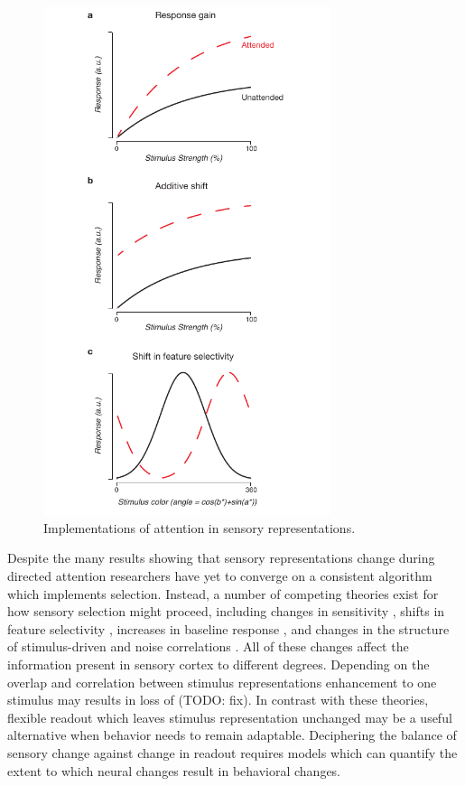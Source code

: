 \begin{figure}[ht]
\centering
\includegraphics[keepaspectratio,width=0.75\textwidth]{figs_c0/attention_models.pdf}
\caption[Sensory implementations of attention]{Implementations of attention in sensory representations. }
\label{fig:c0f3}
\end{figure}

Despite the many results showing that sensory representations change during directed attention researchers have yet to converge on a consistent algorithm which implements selection. Instead, a number of competing theories exist for how sensory selection might proceed, including changes in sensitivity \citep{Reynolds2000-mg,Serences2007-le,Snyder2018-yr,Treue1999-mp}, shifts in feature selectivity \citep{Cukur2013-gx,David2008-zx,Kastner1998-bi,Klein2014-oe,Spitzer1988-ib,Womelsdorf2006-np,Womelsdorf2008-bm}, increases in baseline response \citep{Buracas2007-pe,Chen2012-fu,Fang2008-ny,Kastner1999-qu,Li2008-fe}, and changes in the structure of stimulus-driven and noise correlations \citep{Cohen2009-bt,Mitchell2009-do, Ruff2016-dv,Verhoef2017-cm}. All of these changes affect the information present in sensory cortex to different degrees. Depending on the overlap and correlation between stimulus representations enhancement to one stimulus may results in loss of (TODO: fix). In contrast with these theories, flexible readout which leaves stimulus representation unchanged \citep{Birman_undated-vk} may be a useful alternative when behavior needs to remain adaptable. Deciphering the balance of sensory change against change in readout requires models which can quantify the extent to which neural changes result in behavioral changes. 

